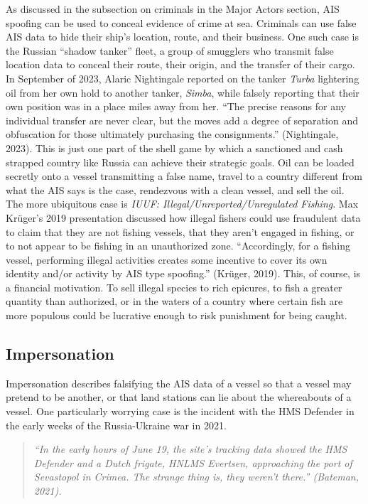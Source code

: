 \documentclass[
]{article}
\begin{document}
As discussed in the subsection on criminals in the Major Actors section,
AIS spoofing can be used to conceal evidence of crime at sea. Criminals
can use false AIS data to hide their ship's location, route, and their
business. One such case is the Russian ``shadow tanker'' fleet, a group
of smugglers who transmit false location data to conceal their route,
their origin, and the transfer of their cargo. In September of 2023,
Alaric Nightingale reported on the tanker \emph{Turba} lightering oil
from her own hold to another tanker, \emph{Simba}, while falsely
reporting that their own position was in a place miles away from her.
``The precise reasons for any individual transfer are never clear, but
the moves add a degree of separation and obfuscation for those
ultimately purchasing the consignments.'' (Nightingale, 2023). This is
just one part of the shell game by which a sanctioned and cash strapped
country like Russia can achieve their strategic goals. Oil can be loaded
secretly onto a vessel transmitting a false name, travel to a country
different from what the AIS says is the case, rendezvous with a clean
vessel, and sell the oil. The more ubiquitous case is \emph{IUUF:
Illegal/Unreported/Unregulated Fishing}. Max Krüger's 2019 presentation
discussed how illegal fishers could use fraudulent data to claim that
they are not fishing vessels, that they aren't engaged in fishing, or to
not appear to be fishing in an unauthorized zone. ``Accordingly, for a
fishing vessel, performing illegal activities creates some incentive to
cover its own identity and/or activity by AIS type spoofing.'' (Krüger,
2019). This, of course, is a financial motivation. To sell illegal
species to rich epicures, to fish a greater quantity than authorized, or
in the waters of a country where certain fish are more populous could be
lucrative enough to risk punishment for being caught.

\hypertarget{impersonation}{%
\subsection{Impersonation}\label{impersonation}}

Impersonation describes falsifying the AIS data of a vessel so that a
vessel may pretend to be another, or that land stations can lie about
the whereabouts of a vessel. One particularly worrying case is the
incident with the HMS Defender in the early weeks of the Russia-Ukraine
war in 2021.

\begin{quote}
\emph{``In the early hours of June 19, the site's tracking data showed
the HMS Defender and a Dutch frigate, HNLMS Evertsen, approaching the
port of Sevastopol in Crimea. The strange thing is, they weren't
there.'' (Bateman, 2021).}
\end{quote}
\end{document}

